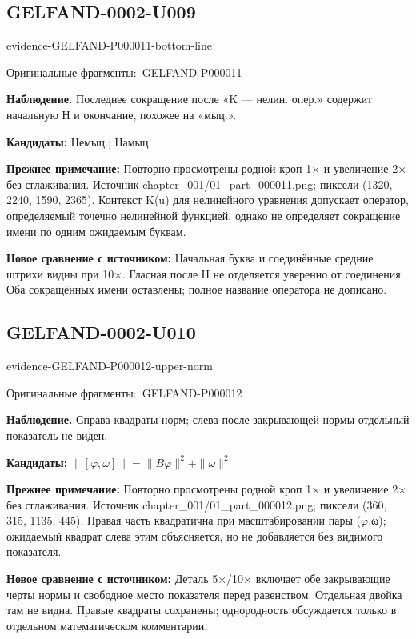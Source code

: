 \documentclass[11pt]{article}
\newcommand{\EvidenceBlock}[4]{%
 \par\smallskip\noindent\begin{minipage}{\linewidth}
 \begin{minipage}[t]{.47\linewidth}\vspace{0pt}\centering
 \csname evidence-#1-#2\endcsname\par
 {\scriptsize\SourceCropCaption\ #1}\par
 \end{minipage}\hfill
 \begin{minipage}[t]{.49\linewidth}\vspace{0pt}\raggedright
 {\small\color{orange!65!black}\textbf{#4} #3}\par
 \end{minipage}
 \end{minipage}\par\smallskip}
\newcommand{\SourceCropCaption}{Оригинальные фрагменты:}\newcommand{\ReadingCaption}{Сомнительное чтение.}\newcommand{\IncompleteCaption}{Неразобранный фрагмент.}\newcommand{\DiagramCaption}{Рисунок и набранное описание.}
\begin{document}
\subsection*{GELFAND-0002-U009}
\EvidenceBlock{GELFAND-P000011}{bottom-line}{Последнее сокращение после «K — нелин. опер.» содержит начальную Н и окончание, похожее на «мыц.».}{Наблюдение.}
\par\smallskip\noindent\textbf{Кандидаты: } Немыц.; Намыц.\par
\par\smallskip\noindent\textbf{Прежнее примечание: } Повторно просмотрены родной кроп 1× и увеличение 2× без сглаживания. Источник chapter\_001/01\_part\_000011.png; пиксели (1320, 2240, 1590, 2365). Контекст K(u) для нелинейного уравнения допускает оператор, определяемый точечно нелинейной функцией, однако не определяет сокращение имени по одним ожидаемым буквам.\par
\par\smallskip\noindent\textbf{Новое сравнение с источником: } Начальная буква и соединённые средние штрихи видны при 10×. Гласная после Н не отделяется уверенно от соединения. Оба сокращённых имени оставлены; полное название оператора не дописано.\par

\subsection*{GELFAND-0002-U010}
\EvidenceBlock{GELFAND-P000012}{upper-norm}{Справа квадраты норм; слева после закрывающей нормы отдельный показатель не виден.}{Наблюдение.}
\par\smallskip\noindent\textbf{Кандидаты: } \(\|[\varphi,\omega]\|=\|B\varphi\|^2+\|\omega\|^2\)\par
\par\smallskip\noindent\textbf{Прежнее примечание: } Повторно просмотрены родной кроп 1× и увеличение 2× без сглаживания. Источник chapter\_001/01\_part\_000012.png; пиксели (360, 315, 1135, 445). Правая часть квадратична при масштабировании пары (\(\varphi\),ω); ожидаемый квадрат слева этим объясняется, но не добавляется без видимого показателя.\par
\par\smallskip\noindent\textbf{Новое сравнение с источником: } Деталь 5×/10× включает обе закрывающие черты нормы и свободное место показателя перед равенством. Отдельная двойка там не видна. Правые квадраты сохранены; однородность обсуждается только в отдельном математическом комментарии.\par
\end{document}
